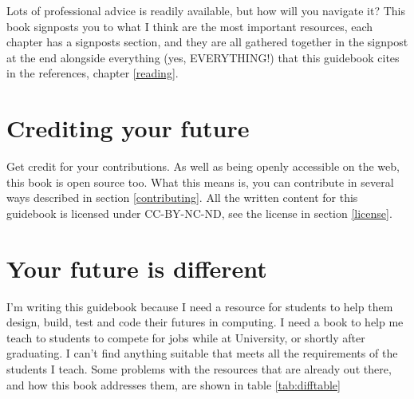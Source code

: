 \documentclass[
]{book}
\begin{document}
Lots of professional advice is readily available, but how will you navigate it? This book signposts you to what I think are the most important resources, each chapter has a signposts section, and they are all gathered together in the signpost at the end alongside everything (yes, EVERYTHING!) that this guidebook cites in the references, chapter \ref{reading}.

\hypertarget{crediting}{%
\section{Crediting your future}\label{crediting}}

Get credit for your contributions. As well as being openly accessible on the web, this book is open source too. What this means is, you can contribute in several ways described in section \ref{contributing}. All the written content for this guidebook is licensed under CC-BY-NC-ND, see the license in section \ref{license}.

\hypertarget{thinkdifferent}{%
\section{Your future is different}\label{thinkdifferent}}

I'm writing this guidebook because I need a resource for students to help them design, build, test and code their futures in computing. I need a book to help me teach to students to compete for jobs while at University, or shortly after graduating. I can't find anything suitable that meets all the requirements of the students I teach. Some problems with the resources that are already out there, and how this book addresses them, are shown in table \ref{tab:difftable}
\end{document}
